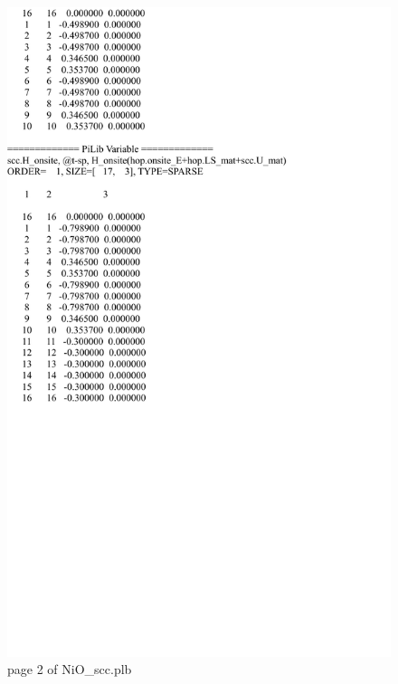 \documentclass[10pt,a4paper]{article}
\begin{document}
\begin{figure}[tbp]
\centering
\includegraphics[width=0.9\columnwidth]{NiO_scc_p2.pdf}
\caption{page 2 of NiO\_scc.plb}
\end{figure}
\end{document}
